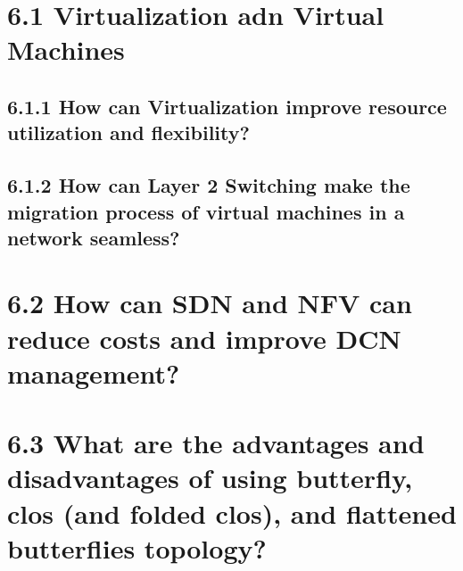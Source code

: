 \documentclass{article}
\begin{document}
	\pagestyle{fancy}
	\hfill
	
	\section*{6.1 Virtualization adn Virtual Machines}
	\begin{adjustwidth}{2em}{2em}
		\subsection*{6.1.1 How can Virtualization improve resource utilization and flexibility?}
		\begin{adjustwidth}{2em}{2em}
		\end{adjustwidth}
		\subsection*{6.1.2 How can Layer 2 Switching make the migration process of virtual machines in a network seamless?}
		\begin{adjustwidth}{2em}{2em}
		\end{adjustwidth}
	\end{adjustwidth}
	
	\section*{6.2 How can SDN and NFV can reduce costs and improve DCN management?}
	\begin{adjustwidth}{2em}{2em}
	\end{adjustwidth}
	
	\section*{6.3 What are the advantages and disadvantages of using butterfly, clos (and folded clos), and flattened butterflies topology?}
	\begin{adjustwidth}{2em}{2em}
	\end{adjustwidth}
	
\end{document}
